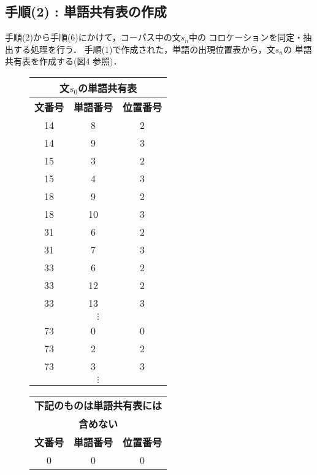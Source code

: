 \subsection*{手順(2) : 単語共有表の作成}

手順(2)から手順(6)にかけて，コーパス中の文$s_n$中の
コロケーションを同定・抽出する処理を行う．
手順\hspace{0.6mm}(1)で\hspace{0.6mm}作成された，単語の出現位置表から，文$s_n$の
単語共有表を作成する(図4
参照)．
\begin{figure}[hbt]
\begin{center}
\begin{footnotesize}
	\begin{minipage}[t]{5cm}
	\begin{tabular}[t]{|c|c|c|}
	\multicolumn{3}{c}{\bf 文$s_0$の単語共有表}\\
	\hline
	\multicolumn{1}{|c|}{\bf 文番号} & \multicolumn{1}{c|}{\bf 単語番号} & \multicolumn{1}{c|}{\bf 位置番号}\\
	\hline
	14 & 8 & 2\\
	14 & 9 & 3\\
	15 & 3 & 2\\
	15 & 4 & 3\\
	18 & 9 & 2\\
	18 & 10 & 3\\
	31 & 6 & 2\\
	31 & 7 & 3\\
	33 & 6 & 2\\
	33 & 12 & 2\\
	33 & 13 & 3\\
	\multicolumn{3}{|c|}{$\vdots$}\\
	73 & 0 & 0\\
	73 & 2 & 2\\
	73 & 3 & 3\\
	\multicolumn{3}{|c|}{$\vdots$}\\
	\end{tabular}
	\end{minipage} \quad
	\begin{minipage}[t]{5cm}
	\begin{tabular}[t]{|c|c|c|}
	\multicolumn{3}{c}{\bf 下記のものは単語共有表には}\\
	\multicolumn{3}{c}{\bf 含めない}\\
	\hline
	\multicolumn{1}{|c|}{\bf 文番号} & \multicolumn{1}{c|}{\bf 単語番号} & \multicolumn{1}{c|}{\bf 位置番号}\\
	\hline
	0 & 0 & 0\\

\end{tabular}
\end{minipage}
\end{footnotesize}
\end{center}
\end{figure}
